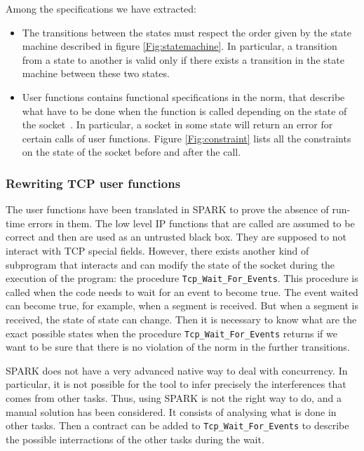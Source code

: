 \documentclass[runningheads]{llncs}
\begin{document}
    Among the specifications we have extracted:
    \begin{itemize}
        \item The transitions between the states must respect the order given by the state machine described
              in figure \ref{Fig:statemachine}.
              In particular, a transition from a state to another is valid only if there exists a transition in the state machine
              between these two states.
        \item User functions contains functional specifications in the norm, that describe what have to be done when the function
              is called depending on the state of the socket~\cite[p.~52]{rfc793}.
              In particular, a socket in some state will return an error for certain calls of user functions. Figure \ref{Fig:constraint}
              lists all the constraints on the state of the socket before and after the call.
    \end{itemize}

\subsubsection{Rewriting TCP user functions}

    The user functions have been translated in SPARK to prove the absence of run-time errors in them. The low level IP functions
    that are called are assumed to be correct and then are used as an untrusted black box. They are supposed to not interact with TCP
    special fields. However, there exists another kind of subprogram that interacts and can modify the state of the socket
    during the execution of the program: the procedure \lstinline{Tcp_Wait_For_Events}. This procedure is called when the code needs
    to wait for an event to become true. The event waited can become true, for example, when a segment is received. But when a
    segment is received, the state of state can change. Then it is necessary to know what are the exact possible states when the
    procedure \lstinline{Tcp_Wait_For_Events} returns if we want to be sure that there is no violation of the norm in the further transitions.

    SPARK does not have a very advanced native way to deal with concurrency. In particular, it is not possible for the tool to infer precisely the
    interferences that comes from other tasks. Thus, using SPARK is not the right way to do, and a manual solution has been considered. It consists
    of analysing what is done in other tasks. Then a contract can be added to \lstinline{Tcp_Wait_For_Events} to describe the possible
    interractions of the other tasks during the wait.
\end{document}
